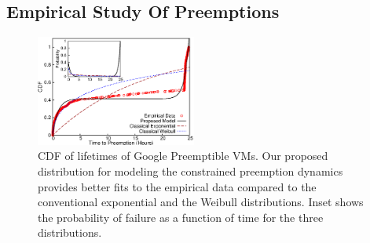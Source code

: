 



\subsection{Empirical Study Of Preemptions}


\begin{figure}
  \includegraphics[width=0.47\textwidth]{../graphs/scispot-fig-cdf-prob-inset-time.eps}
  \caption{CDF of lifetimes of Google Preemptible VMs. Our proposed distribution for modeling the constrained preemption dynamics provides better fits to the empirical data compared to the conventional exponential and the Weibull distributions. Inset shows the probability of failure as a function of time for the three distributions.}
  \label{fig:gcp1}
\end{figure}

